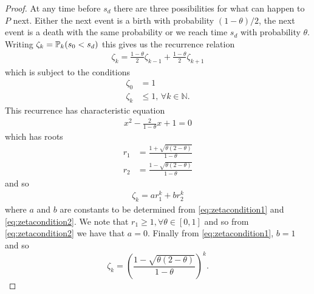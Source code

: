 \begin{proof}
		 At any time before $s_d$ there are three possibilities for what can happen to $P$ next. Either the next event is a birth with probability $(1 - \theta)/2$, the next event is a death with the same probability or we reach time $s_d$ with probability $\theta$. Writing $\zeta_k = \mathbb{P}_k(s_0 < s_d)$ this gives us the recurrence relation
		 \begin{align}
		 	\zeta_k = \frac{1 - \theta}{2} \zeta_{k-1} + \frac{1 - \theta}{2} \zeta_{k+1}
		 \end{align}
		 which is subject to the conditions 
		 \begin{align}
		 	\label{eq:zetacondition1}
		 	\zeta_0 &= 1\\
		 	\zeta_k &\leq 1, \, \forall k \in \mathbb{N}.
		 	\label{eq:zetacondition2}
		 \end{align} 
		 This recurrence has characteristic equation
		 \begin{align}
		 	x^2 - \frac{2}{1 - \theta} x + 1 = 0
		 \end{align}
		 which has roots
		 \begin{align}
		 	r_1 &= \frac{1 + \sqrt{\theta(2 - \theta)}}{1 - \theta}\\
		 	r_2 &= \frac{1 - \sqrt{\theta(2 - \theta)}}{1 - \theta}
		 \end{align}
		 and so
		 \begin{align}
		 	\zeta_k = a r_1^k + b r_2^k
		 \end{align}
		 where $a$ and $b$ are constants to be determined from \eqref{eq:zetacondition1} and \eqref{eq:zetacondition2}. We note that $r_1 \geq 1, \forall \theta \in [0,1]$ and so from \eqref{eq:zetacondition2} we have that $a = 0$. Finally from \eqref{eq:zetacondition1}, $b = 1$ and so
		 \begin{equation}
		 	\zeta_k = \left(\frac{1 - \sqrt{\theta(2 - \theta)}}{1 - \theta}\right)^k.
		 \end{equation}
	\end{proof}

